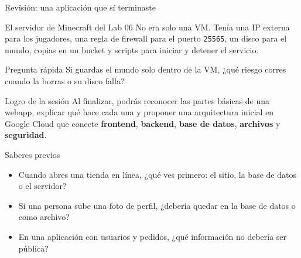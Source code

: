 \documentclass[aspectratio=169,10pt,c]{beamer}
\begin{document}
\begin{frame}{Revisión: una aplicación que sí terminaste}
\begin{block}{El servidor de Minecraft del Lab 06}
\small No era solo una VM. Tenía una IP externa para los jugadores, una regla de firewall para el puerto \texttt{25565}, un disco para el mundo, copias en un bucket y scripts para iniciar y detener el servicio.
\end{block}
\begin{center}
\end{center}
\begin{alertblock}{Pregunta rápida}
\small Si guardas el mundo solo dentro de la VM, ¿qué riesgo corres cuando la borras o su disco falla?
\end{alertblock}
\end{frame}

\begin{frame}[c]
\begin{block}{Logro de la sesión}
Al finalizar, podrás reconocer las partes básicas de una webapp, explicar qué hace cada una y proponer una arquitectura inicial en Google Cloud que conecte \textbf{frontend}, \textbf{backend}, \textbf{base de datos}, \textbf{archivos} y \textbf{seguridad}.
\end{block}
\end{frame}

\begin{frame}{Saberes previos}
\begin{itemize}\setlength\itemsep{11pt}
  \item Cuando abres una tienda en línea, ¿qué ves primero: el sitio, la base de datos o el servidor?
  \item Si una persona sube una foto de perfil, ¿debería quedar en la base de datos o como archivo?
  \item En una aplicación con usuarios y pedidos, ¿qué información no debería ser pública?
\end{itemize}
\end{frame}
\end{document}
